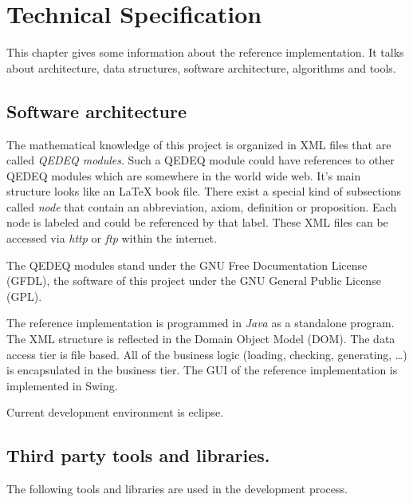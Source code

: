 \documentclass[a4paper,german,10pt,twoside]{book}
\theoremstyle{definition}
\theoremstyle{remark}
\begin{document}

\chapter{Technical Specification\label{ch:technical.specification}} \label{chapter5} \hypertarget{chapter5}{}

This chapter gives some information about the reference implementation. It talks about architecture, data structures, software architecture, algorithms and tools.

\section{Software architecture} \label{chapter5_section0} \hypertarget{chapter5_section0}{}
The mathematical knowledge of this project is organized in XML files that are called \emph{QEDEQ modules}. Such a QEDEQ module could have references to other QEDEQ modules which are somewhere in the world wide web. It's main structure looks like an \LaTeX{} book file. There exist a special kind of subsections called \emph{node} that contain an abbreviation, axiom, definition or proposition. Each node is labeled and could be referenced by that label. These XML files can be accessed via \emph{http} or \emph{ftp} within the internet.

\par
The QEDEQ modules stand under the GNU Free Documentation License (GFDL), the software of this project under the GNU General Public License (GPL).

\par
The reference implementation is programmed in \emph{Java} as a standalone program. The XML structure is reflected in the Domain Object Model (DOM). The data access tier is file based. All of the business logic (loading, checking, generating, \dots) is encapsulated in the business tier. The GUI of the reference implementation is implemented in Swing. 


\par
Current development environment is eclipse.

\section{Third party tools and libraries.} \label{chapter5_section1} \hypertarget{chapter5_section1}{}
The following tools and libraries are used in the development process.
\end{document}
